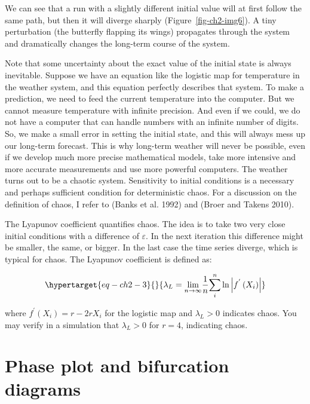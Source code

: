 \documentclass[
  a4paper,
  DIV=11,
  numbers=noendperiod,
  oneside]{scrreprt}
\begin{document}
We can see that a run with a slightly different initial value will at
first follow the same path, but then it will diverge sharply
(Figure~\ref{fig-ch2-img6}). A tiny perturbation (the butterfly flapping
its wings) propagates through the system and dramatically changes the
long-term course of the system.

Note that some uncertainty about the exact value of the initial state is
always inevitable. Suppose we have an equation like the logistic map for
temperature in the weather system, and this equation perfectly describes
that system. To make a prediction, we need to feed the current
temperature into the computer. But we cannot measure temperature with
infinite precision. And even if we could, we do not have a computer that
can handle numbers with an infinite number of digits. So, we make a
small error in setting the initial state, and this will always mess up
our long-term forecast. This is why long-term weather will never be
possible, even if we develop much more precise mathematical models, take
more intensive and more accurate measurements and use more powerful
computers. The weather turns out to be a chaotic system. Sensitivity to
initial conditions is a necessary and perhaps sufficient condition for
deterministic chaos. For a discussion on the definition of chaos, I
refer to (Banks et al. 1992) and (Broer and Takens 2010).

The Lyapunov coefficient quantifies chaos. The idea is to take two very
close initial conditions with a difference of \(\varepsilon\). In the
next iteration this difference might be smaller, the same, or bigger. In
the last case the time series diverge, which is typical for chaos. The
Lyapunov coefficient is defined as:

\begin{equation}\protect\hypertarget{eq-ch2-3}{}{
{\lambda_{L} = \lim_{n \rightarrow \infty}}{\frac{1}{n}}{\sum_{i}^{n}{\ln\left| f^{'}\left( X_{i} \right) \right|}}}\label{eq-ch2-3}\end{equation}

where \(f^{'}\left( X_{i} \right) = r - 2rX_{i}\) for the logistic map
and \(\lambda_{L} > 0\) indicates chaos. You may verify in a simulation
that \(\lambda_{L} > 0\) for \(r = 4\), indicating chaos.

\hypertarget{sec-Phase-plot-and-bifurcation-diagrams}{%
\section{Phase plot and bifurcation
diagrams}\label{sec-Phase-plot-and-bifurcation-diagrams}}
\end{document}
